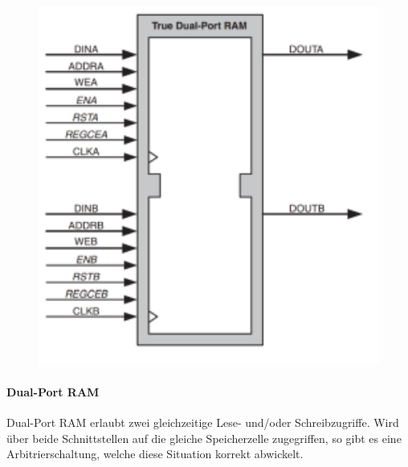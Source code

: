\begin{minipage}{0.3\textwidth}
    \begin{figure}[H]
        \includegraphics[width=1\textwidth]{images/dualportram.png}
    \end{figure}
\end{minipage}
\hfill
\begin{minipage}{0.65\textwidth}
    \paragraph{Dual-Port RAM}
    Dual-Port RAM erlaubt zwei gleichzeitige Lese- und/oder Schreibzugriffe. Wird über beide Schnittstellen auf die gleiche Speicherzelle zugegriffen, so gibt es eine Arbitrierschaltung, welche diese Situation korrekt abwickelt. \ \\ \ \\ \ \\ \ \\ \ \\ \ \\ \ \\ \ \\ \ \\ \ \\
\end{minipage}


